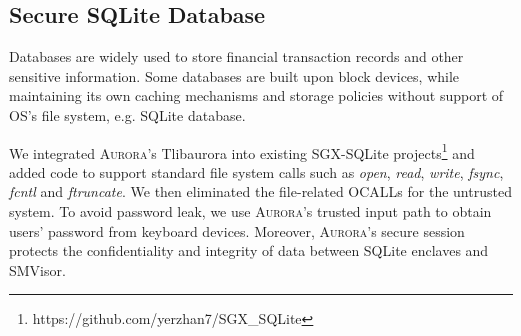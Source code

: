%
%

\subsection{Secure SQLite Database}
Databases are widely used to store financial transaction records and other sensitive information. Some databases are built upon block devices, while maintaining its own caching mechanisms and storage policies without support of OS's file system, e.g. SQLite database.

We integrated \textsc{Aurora}'s Tlibaurora into existing SGX-SQLite projects\footnote{https://github.com/yerzhan7/SGX\_SQLite} and added code to support standard file system calls such as \textit{open}, \textit{read}, \textit{write}, \textit{fsync}, \textit{fcntl} and \textit{ftruncate}. We then eliminated the file-related OCALLs for the untrusted system. 
To avoid password leak, we use \textsc{Aurora}'s trusted input path to obtain users' password from keyboard devices. Moreover, \textsc{Aurora}'s secure session protects the confidentiality and integrity of data between SQLite enclaves and SMVisor.   %


